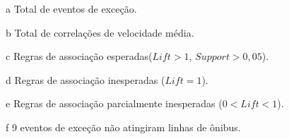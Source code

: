 \documentclass[
	12pt,				%
	oneside,			%
	a4paper,			%
	english,			%
	brazil				%
	]{abntex2ppgsi}
\begin{document}
{{{\begin{apendicesenv}
\begin{table}[!htb]
\begin{threeparttable}
\begin{tablenotes}
            \item[a] Total de eventos de exceção.
            \item[b] Total de correlações de velocidade média.
            \item[c] Regras de associação esperadas($Lift > 1$, $Support > 0,05$).
            \item[d] Regras de associação inesperadas ($Lift = 1$).
            \item[e] Regras de associação parcialmente inesperadas ($0 < Lift < 1$).
            \item[f] 9 eventos de exceção não atingiram linhas de ônibus.
        \end{tablenotes}
\end{threeparttable}
\end{table}


\end{apendicesenv}}}}
\end{document}
